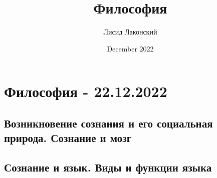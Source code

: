 \documentclass{article}
\title{Философия}
\author{Лисид Лаконский}
\date{December 2022}
\begin{document}
\maketitle
\tableofcontents
\pagebreak

\section{Философия - 22.12.2022}

\subsection{Возникновение сознания и его социальная природа. Сознание и мозг}

\pagebreak
\subsection{Сознание и язык. Виды и функции языка}
\end{document}
